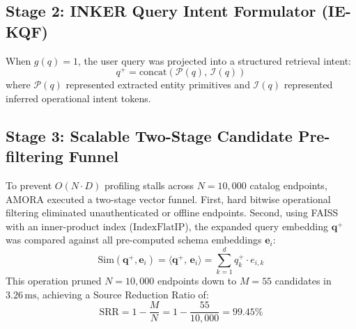 \documentclass[conference,onecolumn,10pt]{IEEEtran}
\begin{document}
\subsection{Stage 2: INKER Query Intent Formulator (IE-KQF)}
\label{subsec:stage2_kqf}
When $g(q) = 1$, the user query was projected into a structured retrieval intent:
\begin{equation}
    q^+ = \text{concat}\left( \mathcal{P}(q), \, \mathcal{I}(q) \right)
\end{equation}
where $\mathcal{P}(q)$ represented extracted entity primitives and $\mathcal{I}(q)$ represented inferred operational intent tokens.

\subsection{Stage 3: Scalable Two-Stage Candidate Pre-filtering Funnel}
\label{subsec:stage3_funnel}
To prevent $O(N \cdot D)$ profiling stalls across $N=10{,}000$ catalog endpoints, AMORA executed a two-stage vector funnel. First, hard bitwise operational filtering eliminated unauthenticated or offline endpoints. Second, using FAISS with an inner-product index ($\text{IndexFlatIP}$), the expanded query embedding $\mathbf{q}^+$ was compared against all pre-computed schema embeddings $\mathbf{e}_i$:
\begin{equation}
    \text{Sim}(\mathbf{q}^+, \mathbf{e}_i) = \langle \mathbf{q}^+, \, \mathbf{e}_i \rangle = \sum_{k=1}^d q^+_k \cdot e_{i,k}
\end{equation}
This operation pruned $N=10{,}000$ endpoints down to $M=55$ candidates in $3.26\,\text{ms}$, achieving a Source Reduction Ratio of:
\begin{equation}
    \text{SRR} = 1 - \frac{M}{N} = 1 - \frac{55}{10{,}000} = 99.45\%
\end{equation}
\end{document}
